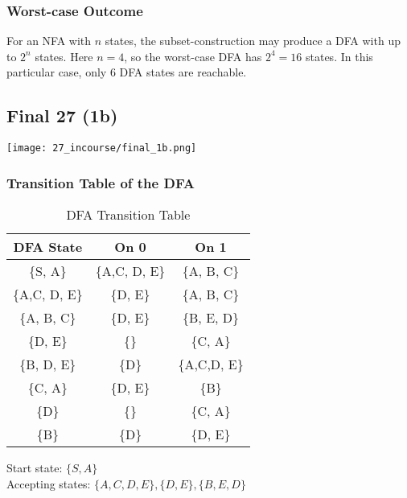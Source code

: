\documentclass[8pt]{article}
\begin{document}
\subsubsection{Worst-case Outcome}
For an NFA with $n$ states, the subset-construction may produce a DFA with up to $2^n$ states.  
Here $n=4$, so the worst-case DFA has $2^4 = 16$ states.  
In this particular case, only 6 DFA states are reachable.
\subsection{Final 27 (1b)}

\begin{center}
    \texttt{[image: 27\_incourse/final\_1b.png]} %
\end{center}
\subsubsection{Transition Table of the DFA}

\begin{table}[H]
    \centering
    \renewcommand{\arraystretch}{1.3} %
    \begin{tabular}{|c|c|c|}
        \hline
        \rowcolor{gray!20} %
        \textbf{DFA State} & \textbf{On 0} & \textbf{On 1} \\
        \hline
        \{S, A\} & \{A,C, D, E\} & \{A, B, C\} \\
        \hline
        \{A,C, D, E\} & \{D, E\} & \{A, B, C\} \\
        \hline
        \{A, B, C\} & \{D, E\} & \{B, E, D\} \\
        \hline
        \{D, E\} & \{\} & \{C, A\} \\
        \hline
        \{B, D, E\} & \{D\} & \{A,C,D, E\} \\
        \hline
        \{C, A\} & \{D, E\} & \{B\} \\
        \hline
        \{D\} & \{\} & \{C, A\} \\
        \hline
        \{B\} & \{D\} & \{D, E\} \\
        \hline
    \end{tabular}
    \caption{DFA Transition Table}
    \label{tab:dfa_transition}
\end{table}

Start state: $\{S, A\}$ \\
Accepting states: $\{A,C,D, E\}, \{D, E\}, \{B, E, D\}$
\end{document}
